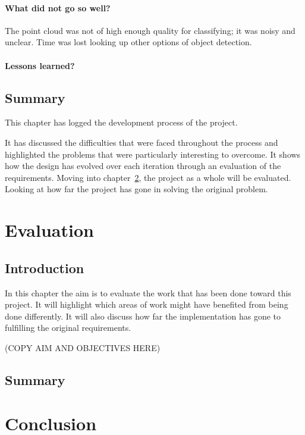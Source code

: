 \documentclass[11pt,oneside]{report}
\begin{document}
			\subsubsection{What did not go so well?}
			The point cloud was not of high enough quality for classifying; it was noisy and unclear.
			Time was lost looking up other options of object detection.
			\subsubsection{Lessons learned?}
	\section{Summary}
	This chapter has logged the development process of the project.
	
	It has discussed the difficulties that were faced throughout the process and highlighted the problems that were particularly interesting to overcome.
	It shows how the design has evolved over each iteration through an evaluation of the requirements.
	Moving into chapter~\ref{chap:eval}, the project as a whole will be evaluated.
	Looking at how far the project has gone in solving the original problem.

	
	\chapter{Evaluation}\label{chap:eval}
	\section{Introduction}
	In this chapter the aim is to evaluate the work that has been done toward this project.
	It will highlight which areas of work might have benefited from being done differently.
	It will also discuss how far the implementation has gone to fulfilling the original requirements.
	
	(COPY AIM AND OBJECTIVES HERE)
	
	\section{Summary}
	
	\chapter{Conclusion}\label{chap:concl}
\end{document}
